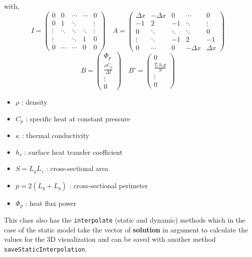 \documentclass{article}
\begin{document}
with,
\[
I = 
\begin{pmatrix}
    0 & 0 & \cdots & \cdots & 0 \\
    0 & 1 & \ddots &  & \vdots \\
    \vdots & \ddots & \ddots & \ddots & \vdots \\
    \vdots &  & \ddots & 1 & 0 \\
    0 & \cdots & \cdots & 0 & 0
\end{pmatrix}
\quad
A = 
\begin{pmatrix}
    \Delta x & -\Delta x & 0    & \cdots & 0  \\
    -1      & 2         & -1     & \ddots & \vdots  \\
    0       & \ddots    & \ddots & \ddots & 0 \\
    \vdots  &    \ddots  & -1 & 2 & -1 \\
    0         & \cdots  &    0    & -\Delta x& \Delta x 
\end{pmatrix}
\]
\[
B = 
\begin{pmatrix}
    \Phi_p \\ \frac{\rho C_p}{\Delta t} \\ \vdots \\ 0
\end{pmatrix}
\quad
B' = 
\begin{pmatrix}
    0 \\ \frac{T_e h_c p}{S} \\ \vdots \\ 0
\end{pmatrix}
\]
\begin{itemize}
\item $\rho$ : density 
\item $C_p$ : specific heat at constant pressure 
\item $\kappa$ : thermal conductivity
\item $h_c$ : surface heat transfer coefficient
\item $S = L_y L_z$ : cross-sectional area
\item $p = 2(L_y + L_y)$ : cross-sectional perimeter
\item $\Phi_p$ : heat flux power 
\end{itemize}


This class also has the \texttt{interpolate} (static and dynamic) methods which in the case of the static model take the vector of \textbf{solution} in argument to calculate the values for the 3D visualization and can be saved with another method \texttt{saveStaticInterpolation}.\\
\end{document}
